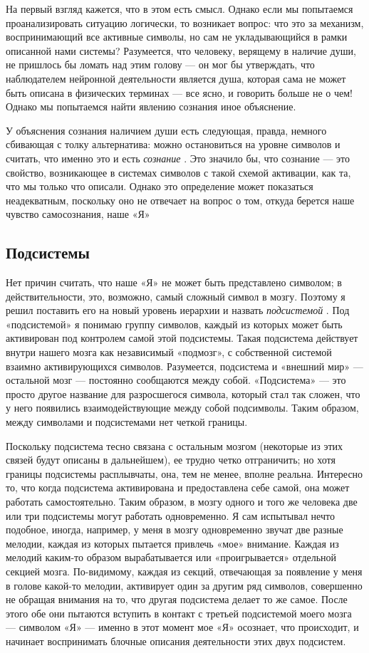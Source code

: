 \documentclass[../main.tex]{subfiles}
\begin{document}
На первый взгляд кажется, что в этом есть смысл. Однако если мы попытаемся проанализировать ситуацию логически, то возникает вопрос: что это за механизм, воспринимающий все активные символы, но сам не укладывающийся в рамки описанной нами системы? Разумеется, что человеку, верящему в наличие души, не пришлось бы ломать над этим голову --- он мог бы утверждать, что наблюдателем нейронной деятельности является душа, которая сама не может быть описана в физических терминах --- все ясно, и говорить больше не о чем! Однако мы попытаемся найти явлению сознания иное объяснение.

У объяснения сознания наличием души есть следующая, правда, немного сбивающая с толку альтернатива: можно остановиться на уровне символов и считать, что именно это и есть \emph{сознание} . Это значило бы, что сознание --- это свойство, возникающее в системах символов с такой схемой активации, как та, что мы только что описали. Однако это определение может показаться неадекватным, поскольку оно не отвечает на вопрос о том, откуда берется наше чувство самосознания, наше «Я»


\subsection{Подсистемы}

Нет причин считать, что наше «Я» не может быть представлено символом; в действительности, это, возможно, самый сложный символ в мозгу. Поэтому я решил поставить его на новый уровень иерархии и назвать \emph{подсистемой} . Под «подсистемой» я понимаю группу символов, каждый из которых может быть активирован под контролем самой этой подсистемы. Такая подсистема действует внутри нашего мозга как независимый «подмозг», с собственной системой взаимно активирующихся символов. Разумеется, подсистема и «внешний мир» --- остальной мозг --- постоянно сообщаются между собой. «Подсистема» --- это просто другое название для разросшегося символа, который стал так сложен, что у него появились взаимодействующие между собой подсимволы. Таким образом, между символами и подсистемами нет четкой границы.

Поскольку подсистема тесно связана с остальным мозгом (некоторые из этих связей будут описаны в дальнейшем), ее трудно четко отграничить; но хотя границы подсистемы расплывчаты, она, тем не менее, вполне реальна. Интересно то, что когда подсистема активирована и предоставлена себе самой, она может работать самостоятельно. Таким образом, в мозгу одного и того же человека две или три подсистемы могут работать одновременно. Я сам испытывал нечто подобное, иногда, например, у меня в мозгу одновременно звучат две разные мелодии, каждая из которых пытается привлечь «мое» внимание. Каждая из мелодий каким-то образом вырабатывается или «проигрывается» отдельной секцией мозга. По-видимому, каждая из секций, отвечающая за появление у меня в голове какой-то мелодии, активирует один за другим ряд символов, совершенно не обращая внимания на то, что другая подсистема делает то же самое. После этого обе они пытаются вступить в контакт с третьей подсистемой моего мозга --- символом «Я» --- именно в этот момент мое «Я» осознает, что происходит, и начинает воспринимать блочные описания деятельности этих двух подсистем.
\end{document}
